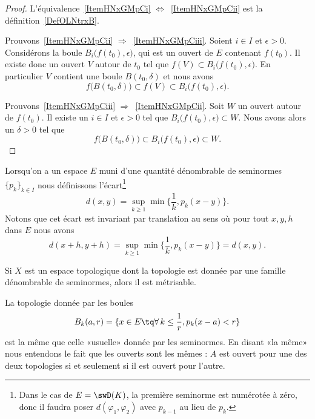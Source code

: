 \begin{proof}
    L'équivalence~\ref{ItemHNxGMpCi} \( \Leftrightarrow\)~\ref{ItemHNxGMpCii} est la définition~\ref{DefOLNtrxB}.

    Prouvons~\ref{ItemHNxGMpCii} \( \Rightarrow\)~\ref{ItemHNxGMpCiii}. Soient \( i\in I\) et \( \epsilon>0\). Considérons la boule \( B_i\big( f(t_0),\epsilon \big)\), qui est un ouvert de \( E\) contenant \( f(t_0)\). Il existe donc un ouvert \( V\) autour de \( t_0\) tel que \( f(V)\subset B_i\big( f(t_0),\epsilon \big)\). En particulier \( V\) contient une boule \( B(t_0,\delta)\) et nous avons
    \begin{equation}
        f\big( B(t_0,\delta) \big)\subset f(V)\subset B_i\big( f(t_0),\epsilon \big).
    \end{equation}

    Prouvons~\ref{ItemHNxGMpCiii} \( \Rightarrow\)~\ref{ItemHNxGMpCii}. Soit \( W\) un ouvert autour de \( f(t_0)\). Il existe un \( i\in I\) et \( \epsilon>0\) tel que \( B_i\big( f(t_0),\epsilon \big)\subset W\). Nous avons alors un \( \delta>0\) tel que
    \begin{equation}
        f\big( B(t_0,\delta) \big)\subset B_i\big( f(t_0),\epsilon \big)\subset W.
    \end{equation}
\end{proof}

Lorsqu'on a un espace \( E\) muni d'une quantité dénombrable de seminormes \( \{ p_k \}_{k\in I}\) nous définissons l'écart\footnote{Dans le cas de \( E=\swD(K)\), la première seminorme est numérotée à zéro, donc il faudra poser \( d(\varphi_1,\varphi_2)\) avec \( p_{k-1}\) au lieu de \( p_k\).}
\begin{equation}        \label{EqAAghiUR}
    d(x,y)=\sup_{k\geq 1}\min\big\{  \frac{1}{ k },p_k(x-y) \big\}.
\end{equation}
Notons que cet écart est invariant par translation au sens où pour tout \( x,y,h\) dans \( E\) nous avons
\begin{equation}
    d(x+h,y+h)=\sup_{k\geq 1}\min\big\{ \frac{1}{ k },p_k(x-y) \big\}=d(x,y).
\end{equation}


\begin{proposition}     \label{PROPooMJEQooHtIyeX}
    Si \( X\) est un espace topologique dont la topologie est donnée par une famille dénombrable de seminormes, alors il est métrisable.
\end{proposition}

\begin{proposition} \label{PropLOwUvCO}
    La topologie donnée par les boules
    \begin{equation}    \label{EqGHfYIlQ}
        B_k(a,r)=\{ x\in E\tq \forall\,k\leq \frac{1}{ r },p_k(x-a)<r\}
    \end{equation}
    est la même que celle «usuelle» donnée par les seminormes. En disant «la même» nous entendons le fait que les ouverts sont les mêmes : \( A\) est ouvert pour une des deux topologies si et seulement si il est ouvert pour l'autre.
\end{proposition}

